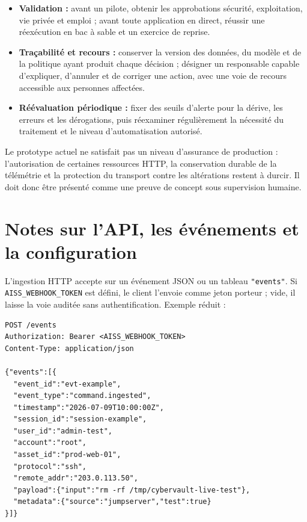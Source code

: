 \documentclass[11pt,a4paper,oneside]{report}
\theoremstyle{definition}
\theoremstyle{plain}
\begin{document}
\begin{itemize}[leftmargin=*]
  \item \textbf{Validation :} avant un pilote, obtenir les approbations
  sécurité, exploitation, vie privée et emploi ; avant toute application en
  direct, réussir une réexécution en bac à sable et un exercice de reprise.

  \item \textbf{Traçabilité et recours :} conserver la version des données,
  du modèle et de la politique ayant produit chaque décision ; désigner un
  responsable capable d'expliquer, d'annuler et de corriger une action, avec
  une voie de recours accessible aux personnes affectées.

  \item \textbf{Réévaluation périodique :} fixer des seuils d'alerte pour la
  dérive, les erreurs et les dérogations, puis réexaminer régulièrement la
  nécessité du traitement et le niveau d'automatisation autorisé.
\end{itemize}

Le prototype actuel ne satisfait pas un niveau d'assurance de production :
l'autorisation de certaines ressources HTTP, la conservation durable de la
télémétrie et la protection du transport contre les altérations restent à
durcir. Il doit donc être présenté comme une preuve de concept sous supervision
humaine.

\chapter{Notes sur l'API, les événements et la configuration}
\label{app:api}

L'ingestion HTTP accepte sur  un événement JSON ou un tableau
\texttt{"events"}. Si \texttt{AISS\_WEBHOOK\_TOKEN} est défini, le client
l'envoie comme jeton porteur ; vide, il laisse la voie auditée sans
authentification. Exemple réduit :

\begin{verbatim}
POST /events
Authorization: Bearer <AISS_WEBHOOK_TOKEN>
Content-Type: application/json

{"events":[{
  "event_id":"evt-example",
  "event_type":"command.ingested",
  "timestamp":"2026-07-09T10:00:00Z",
  "session_id":"session-example",
  "user_id":"admin-test",
  "account":"root",
  "asset_id":"prod-web-01",
  "protocol":"ssh",
  "remote_addr":"203.0.113.50",
  "payload":{"input":"rm -rf /tmp/cybervault-live-test"},
  "metadata":{"source":"jumpserver","test":true}
}]}
\end{verbatim}
\end{document}
